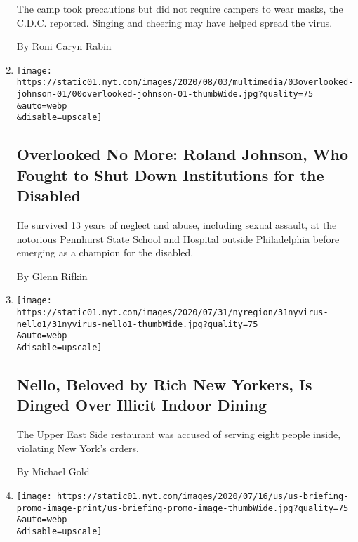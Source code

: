 \begin{enumerate}
  The camp took precautions but did not require campers to wear masks,
  the C.D.C. reported. Singing and cheering may have helped spread the
  virus.

  By Roni Caryn Rabin
\item
  \href{/2020/07/31/obituaries/roland-johnson-overlooked.html}{}

  \texttt{[image: https://static01.nyt.com/images/2020/08/03/multimedia/03overlooked-johnson-01/00overlooked-johnson-01-thumbWide.jpg?quality=75\\\&auto=webp\\\&disable=upscale]}

  \hypertarget{overlooked-no-more-roland-johnson-who-fought-to-shut-down-institutions-for-the-disabled}{%
  \subsection{Overlooked No More: Roland Johnson, Who Fought to Shut
  Down Institutions for the
  Disabled}\label{overlooked-no-more-roland-johnson-who-fought-to-shut-down-institutions-for-the-disabled}}

  He survived 13 years of neglect and abuse, including sexual assault,
  at the notorious Pennhurst State School and Hospital outside
  Philadelphia before emerging as a champion for the disabled.

  By Glenn Rifkin
\item
  \href{/2020/07/31/nyregion/nello-liquor-license-suspended.html}{}

  \texttt{[image: https://static01.nyt.com/images/2020/07/31/nyregion/31nyvirus-nello1/31nyvirus-nello1-thumbWide.jpg?quality=75\\\&auto=webp\\\&disable=upscale]}

  \hypertarget{nello-beloved-by-rich-new-yorkers-is-dinged-over-illicit-indoor-dining}{%
  \subsection{Nello, Beloved by Rich New Yorkers, Is Dinged Over Illicit
  Indoor
  Dining}\label{nello-beloved-by-rich-new-yorkers-is-dinged-over-illicit-indoor-dining}}

  The Upper East Side restaurant was accused of serving eight people
  inside, violating New York's orders.

  By Michael Gold
\item
  \href{/2020/07/31/world/coronavirus-covid-19.html}{}

  \texttt{[image: https://static01.nyt.com/images/2020/07/16/us/us-briefing-promo-image-print/us-briefing-promo-image-thumbWide.jpg?quality=75\\\&auto=webp\\\&disable=upscale]}


\end{enumerate}
